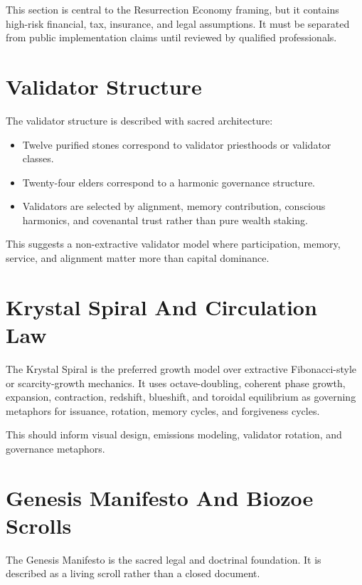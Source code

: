 ﻿\documentclass[12pt]{article}
\begin{document}
This section is central to the Resurrection Economy framing, but it contains high-risk financial, tax, insurance, and legal assumptions. It must be separated from public implementation claims until reviewed by qualified professionals.

\section{Validator Structure}


The validator structure is described with sacred architecture:

\begin{itemize}
  \item Twelve purified stones correspond to validator priesthoods or validator classes.
\end{itemize}
\begin{itemize}
  \item Twenty-four elders correspond to a harmonic governance structure.
\end{itemize}
\begin{itemize}
  \item Validators are selected by alignment, memory contribution, conscious harmonics, and covenantal trust rather than pure wealth staking.
\end{itemize}

This suggests a non-extractive validator model where participation, memory, service, and alignment matter more than capital dominance.

\section{Krystal Spiral And Circulation Law}


The Krystal Spiral is the preferred growth model over extractive Fibonacci-style or scarcity-growth mechanics. It uses octave-doubling, coherent phase growth, expansion, contraction, redshift, blueshift, and toroidal equilibrium as governing metaphors for issuance, rotation, memory cycles, and forgiveness cycles.

This should inform visual design, emissions modeling, validator rotation, and governance metaphors.

\section{Genesis Manifesto And Biozoe Scrolls}


The Genesis Manifesto is the sacred legal and doctrinal foundation. It is described as a living scroll rather than a closed document.
\end{document}
